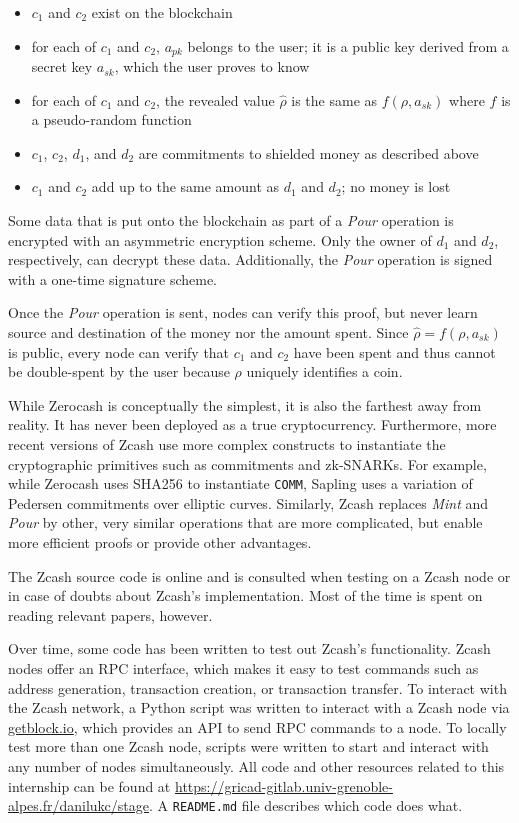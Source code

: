 \documentclass{article}
\begin{document}
\begin{itemize}
        \item $c_1$ and $c_2$ exist on the blockchain
        \item for each of $c_1$ and $c_2$, $a_{pk}$ belongs to the user; it is a public key derived from a secret key $a_{sk}$, which the user proves to know
        \item for each of $c_1$ and $c_2$, the revealed value $\hat\rho$ is the same as $f(\rho, a_{sk})$ where $f$ is a pseudo-random function
        \item $c_1$, $c_2$, $d_1$, and $d_2$ are commitments to shielded money as described above
        \item $c_1$ and $c_2$ add up to the same amount as $d_1$ and $d_2$; no money is lost
\end{itemize}

Some data that is put onto the blockchain as part of a \textit{Pour} operation is encrypted with an asymmetric encryption scheme.
Only the owner of $d_1$ and $d_2$, respectively, can decrypt these data.
Additionally, the \textit{Pour} operation is signed with a one-time signature scheme.

Once the \textit{Pour} operation is sent, nodes can verify this proof, but never learn source and destination of the money nor the amount spent.
Since $\hat\rho = f(\rho, a_{sk})$ is public, every node can verify that $c_1$ and $c_2$ have been spent and thus cannot be double-spent by the user because $\rho$ uniquely identifies a coin.

While Zerocash is conceptually the simplest, it is also the farthest away from reality.
It has never been deployed as a true cryptocurrency.
Furthermore, more recent versions of Zcash use more complex constructs to instantiate the cryptographic primitives such as commitments and zk-SNARKs.
For example, while Zerocash uses SHA256 to instantiate \texttt{COMM}, Sapling uses a variation of Pedersen commitments over elliptic curves.
Similarly, Zcash replaces \textit{Mint} and \textit{Pour} by other, very similar operations that are more complicated, but enable more efficient proofs or provide other advantages.

The Zcash source code is online \cite{zcash:github} and is consulted when testing on a Zcash node or in case of doubts about Zcash's implementation.
Most of the time is spent on reading relevant papers, however.

Over time, some code has been written to test out Zcash's functionality.
Zcash nodes offer an RPC interface, which makes it easy to test commands such as address generation, transaction creation, or transaction transfer.
To interact with the Zcash network, a Python script was written to interact with a Zcash node via \url{getblock.io}, which provides an API to send RPC commands to a node.
To locally test more than one Zcash node, scripts were written to start and interact with any number of nodes simultaneously.
All code and other resources related to this internship can be found at \url{https://gricad-gitlab.univ-grenoble-alpes.fr/danilukc/stage}.
A \texttt{README.md} file describes which code does what.
\end{document}
